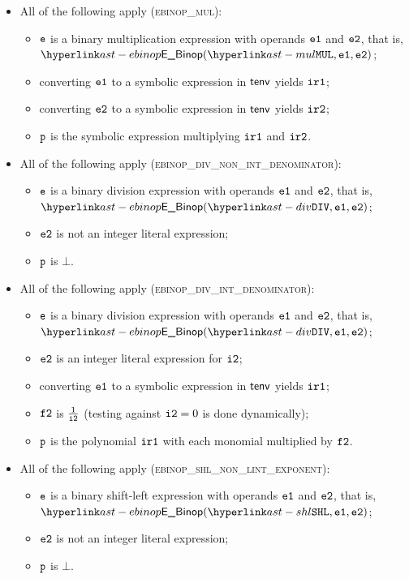\begin{itemize}
  \item All of the following apply (\textsc{ebinop\_mul}):
  \begin{itemize}
    \item $\texttt{e}$ is a binary multiplication expression with operands $\texttt{e1}$ and $\texttt{e2}$, that is, \\ $\EBinop(\MUL, \veone, \vetwo)$;
    \item converting $\texttt{e1}$ to a symbolic expression in $\textsf{tenv}$ yields $\texttt{ir1}$\ProseOrTypeErrorOrBot;
    \item converting $\texttt{e2}$ to a symbolic expression in $\textsf{tenv}$ yields $\texttt{ir2}$\ProseOrTypeErrorOrBot;
    \item $\texttt{p}$ is the symbolic expression multiplying $\texttt{ir1}$ and $\texttt{ir2}$.
  \end{itemize}

  \item All of the following apply (\textsc{ebinop\_div\_non\_int\_denominator}):
  \begin{itemize}
    \item $\texttt{e}$ is a binary division expression with operands $\texttt{e1}$ and $\texttt{e2}$, that is, \\ $\EBinop(\DIV, \veone, \vetwo)$;
    \item $\texttt{e2}$ is not an integer literal expression;
    \item $\texttt{p}$ is $\bot$.
  \end{itemize}

  \item All of the following apply (\textsc{ebinop\_div\_int\_denominator}):
  \begin{itemize}
    \item $\texttt{e}$ is a binary division expression with operands $\texttt{e1}$ and $\texttt{e2}$, that is, \\ $\EBinop(\DIV, \veone, \vetwo)$;
    \item $\texttt{e2}$ is an integer literal expression for $\texttt{i2}$;
    \item converting $\texttt{e1}$ to a symbolic expression in $\textsf{tenv}$ yields $\texttt{ir1}$\ProseOrTypeErrorOrBot;
    \item $\texttt{f2}$ is $\frac{1}{\texttt{i2}}$ (testing against $\texttt{i2} = 0$ is done dynamically);
    \item $\texttt{p}$ is the polynomial $\texttt{ir1}$ with each monomial multiplied by $\texttt{f2}$.
  \end{itemize}

  \item All of the following apply (\textsc{ebinop\_shl\_non\_lint\_exponent}):
  \begin{itemize}
    \item $\texttt{e}$ is a binary shift-left expression with operands $\texttt{e1}$ and $\texttt{e2}$, that is, \\ $\EBinop(\SHL, \veone, \vetwo)$;
    \item $\texttt{e2}$ is not an integer literal expression;
    \item $\texttt{p}$ is $\bot$.
  \end{itemize}


\end{itemize}
